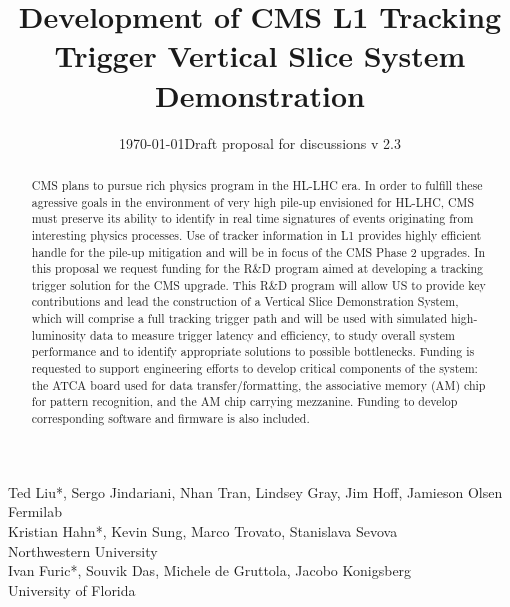 \documentclass{cmspaper}
\begin{document}
\begin{titlepage}
\date{\today}
\date{Draft proposal for discussions v 2.3}
\title{Development of CMS L1 Tracking Trigger Vertical Slice System Demonstration}
\begin{Authlist}
Ted Liu*, Sergo Jindariani, Nhan Tran, Lindsey Gray, Jim Hoff, Jamieson Olsen \\
Fermilab\\
Kristian Hahn*, Kevin Sung, Marco Trovato, Stanislava Sevova \\
Northwestern University\\
Ivan Furic*, Souvik Das, Michele de Gruttola, Jacobo Konigsberg\\
University of Florida\\
\end{Authlist}


\begin{abstract}
CMS plans to pursue rich physics program in the HL-LHC era. In order to fulfill these agressive goals in the environment of very high pile-up envisioned for HL-LHC, CMS must preserve its ability to identify in real time signatures of events originating from interesting physics processes. Use of tracker information in L1 provides highly efficient handle for the pile-up mitigation and will be in focus of the CMS Phase 2 upgrades. In this proposal we request funding for the R\&D program aimed at developing a tracking trigger solution for the CMS upgrade. This R\&D program will allow US to provide key contributions and lead the construction of a Vertical Slice Demonstration System, which will comprise a full tracking trigger path and will be used with simulated high-luminosity data to measure trigger latency and efficiency, to study overall system performance and to identify appropriate solutions to possible bottlenecks. Funding is requested to support engineering efforts to develop critical components of the system: the ATCA board used for data transfer/formatting, the associative memory (AM) chip for pattern recognition, and the AM chip carrying mezzanine. Funding to develop corresponding software and firmware is also included. 
\end{abstract}
\end{titlepage}
\newpage
\tableofcontents
\newpage

%
%
\end{document}
